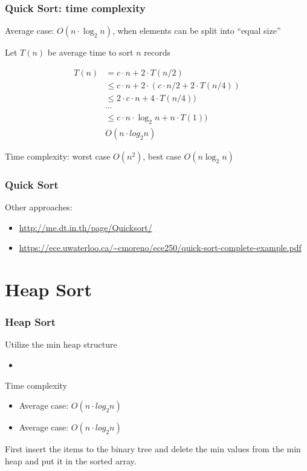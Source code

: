 \documentclass[newPxFont,sthlmFooter,nooffset]{beamer}
\begin{document}
\begin{frame}[t]
  \frametitle{Quick Sort: time complexity}
Average case: $O(n \cdot \log_{2}n)$, when elements can be split into ``equal size''

Let $T(n)$ be average time to sort $n$ records

\begin{align*}
T(n) & =  c \cdot n + 2 \cdot T(n/2) \\
     &\leq c \cdot n + 2 \cdot (c \cdot n/2 + 2 \cdot T(n/4)) \\
     &\leq 2 \cdot c \cdot n + 4 \cdot T(n/4)) \\
     & \cdots \\
     &\leq c \cdot n \cdot \log_{2}n + n \cdot T(1)) \\
     & O(n\cdot log_2n)
\end{align*}

Time complexity: worst case $O(n^2)$, best case $O(n\log_{2}n)$
\end{frame}


\begin{frame}[t]
  \frametitle{Quick Sort}
  Other approaches: 
  \begin{itemize}
  \item     \url{http://me.dt.in.th/page/Quicksort/}
  \item     \url{https://ece.uwaterloo.ca/~cmoreno/ece250/quick-sort-complete-example.pdf}
  \end{itemize}
\end{frame}


\section{Heap Sort}
\begin{frame}[t]
  \frametitle{Heap Sort}
Utilize the min heap structure
\begin{itemize}
\item<implement min heap with array> 
\end{itemize}

Time complexity
\begin{itemize}
\item Average case: $O(n \cdot log_2n)$
\item Average case: $O(n \cdot log_2n)$
\end{itemize}

First insert the items to the binary tree and delete the min values from the min heap and put it in the sorted array.
\end{frame}
\end{document}
